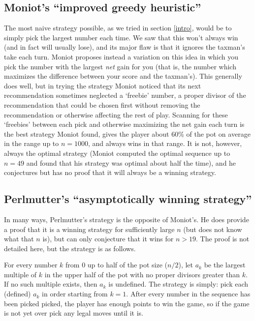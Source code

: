 \documentclass[a4paper,10pt]{amsart} %
\begin{document}
\subsection{Moniot's ``improved greedy heuristic''} \label{moniot}

The most naive strategy possible, as we tried in section \ref{intro}, would be to simply pick the largest number each time. We saw that this won't always win (and in fact will usually lose), and its major flaw is that it ignores the taxman's take each turn. Moniot proposes instead a variation on this idea in which you pick the number with the largest \textit{net} gain for you (that is, the number which maximizes the difference between your score and the taxman's). This generally does well, but in trying the strategy Moniot noticed that its next recommendation sometimes neglected a `freebie' number, a proper divisor of the recommendation that could be chosen first without removing the recommendation or otherwise affecting the rest of play. Scanning for these `freebies' between each pick and otherwise maximizing the net gain each turn is the best strategy Moniot found, gives the player about 60\% of the pot on average in the range up to $n = 1000$, and always wins in that range. It is not, however, always the optimal strategy (Moniot computed the optimal sequence up to $n = 49$ and found that his strategy was optimal about half the time), and he conjectures but has no proof that it will always be a winning strategy. 

\subsection{Perlmutter's ``asymptotically winning strategy''} \label{perlmutter} 
In many ways, Perlmutter's strategy is the opposite of Moniot's. He does provide a proof that it is a winning strategy for sufficiently large $n$ (but does not know what that $n$ is), but can only conjecture that it wins for $n > 19$. The proof is not detailed here, but the strategy is as follows. 

For every number $k$ from 0 up to half of the pot size ($n/2$), let $a_k$ be the largest multiple of $k$ in the upper half of the pot with no proper divisors greater than $k$. If no such multiple exists, then $a_k$ is undefined. The strategy is simply: pick each (defined) $a_k$ in order starting from $k = 1$. After every number in the sequence has been picked picked, the player has enough points to win the game, so if the game is not yet over pick any legal moves until it is. 
\end{document}
